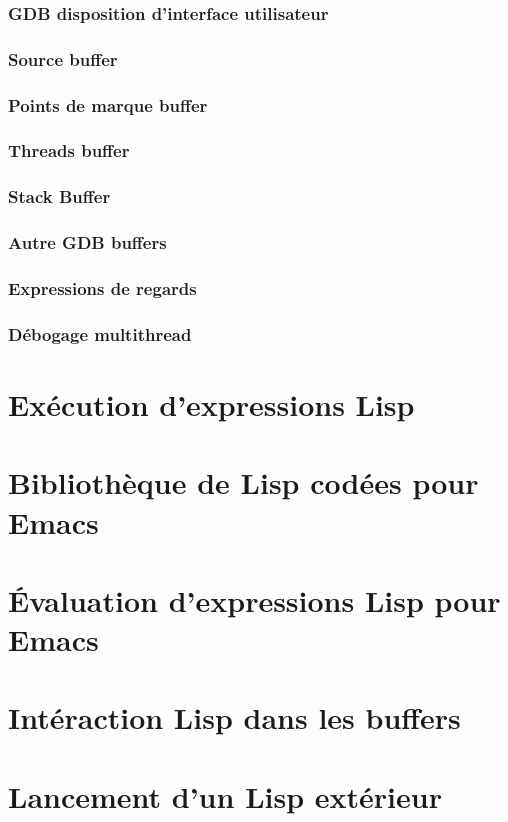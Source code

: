 \subsubsection{GDB disposition d'interface utilisateur}
\subsubsection{Source buffer}
\subsubsection{Points de marque buffer}
\subsubsection{Threads buffer}
\subsubsection{Stack Buffer}
\subsubsection{Autre GDB buffers}
\subsubsection{Expressions de regards}
\subsubsection{Débogage multithread}
\section{Exécution d'expressions Lisp}\label{chap24sec6}
\section{Bibliothèque de Lisp codées pour Emacs}\label{chap24sec7}
\section{\'Evaluation d'expressions Lisp pour Emacs}\label{chap24sec8}
\section{Intéraction Lisp dans les buffers}\label{chap24sec9}
\section{Lancement d'un Lisp extérieur}\label{chap24sec10}
